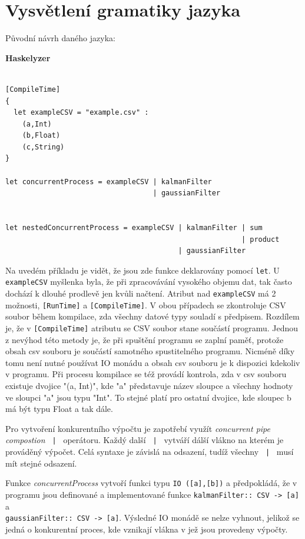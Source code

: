 \documentclass[male,czech]{kithesis}
\newcommand{\haskellInline}[1]{\colorbox{gray!10}{\texttt{#1}}}
\begin{document}
\section{Vysvětlení gramatiky jazyka}


\setlength{\parindent}{0pt}
Původní návrh daného jazyka:

\textbf{Haskelyzer}
\begin{verbatim}

[CompileTime]
{
  let exampleCSV = "example.csv" :
    (a,Int)
    (b,Float)
    (c,String)
}

let concurrentProcess = exampleCSV | kalmanFilter 
                                   | gaussianFilter 
                                      

let nestedConcurrentProcess = exampleCSV | kalmanFilter | sum
                                                        | product
                                         | gaussianFilter

\end{verbatim}

Na uvedém příkladu je vidět,
že jsou zde funkce deklarovány pomocí \haskellInline{let}.
U \haskellInline{exampleCSV} myšlenka byla, 
že při zpracovávání vysokého objemu dat,
tak často dochází k dlouhé prodlevě jen kvůli načtení.
Atribut nad \haskellInline{exampleCSV} 
má 2 možnosti, 
\haskellInline{[RunTime]} a \haskellInline{[CompileTime]}.
V obou případech se
zkontroluje CSV soubor během kompilace, 
zda všechny datové typy souladí s předpisem.
Rozdílem je, 
že v \haskellInline{[CompileTime]} atributu se CSV soubor
stane součástí programu. 
Jednou z nevýhod této metody je, 
že při spuštění programu se zaplní paměť, 
protože obsah csv souboru je součástí samotného spustitelného programu.
Nicméně díky tomu není nutné používat IO monádu a 
obsah csv souboru je k dispozici kdekoliv v programu.
Při procesu kompilace se též provádí kontrola, 
zda v csv souboru existuje dvojice "(a, Int)", 
kde "a" představuje název sloupce a 
všechny hodnoty ve sloupci "a" jsou typu "Int".
To stejné platí pro ostatní dvojice, 
kde sloupec b má být typu Float a tak dále.

Pro vytvoření konkurentního výpočtu je zapotřebí využít \textit{concurrent pipe compostion}
\haskellInline{ | } operátoru. 
Každý další \haskellInline{ | } vytváří dálší vlákno na kterém je prováděný výpočet.
Celá syntaxe je závislá na odsazení, 
tudíž všechny \haskellInline{ | } musí mít stejné odsazení.

Funkce \textit{concurrentProcess} vytvoří funkci typu \haskellInline{IO ([a],[b])} a 
předpokládá, 
že v programu jsou definované a implementované funkce
\haskellInline{kalmanFilter:: CSV -> [a]} a \\
\haskellInline{gaussianFilter:: CSV -> [a]}. 
Výsledné IO monádě se nelze vyhnout, 
jelikož se jedná o konkurentní proces, 
kde vznikají vlákna v jež jsou provedeny výpočty. 
\end{document}
